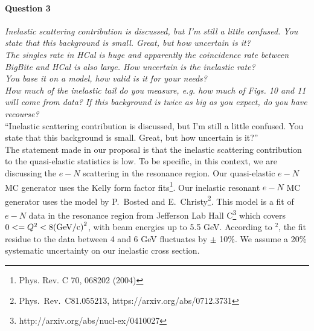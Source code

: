 \documentclass[11pt]{article}
\begin{document}


\paragraph{Question 3}
{\it Inelastic scattering contribution is discussed, but I'm still a
little confused. You state that this background is small.
Great, but how uncertain is it?}\\
{\it The singles rate in HCal is huge and apparently the coincidence rate between BigBite and HCal is also large. 
How uncertain is the inelastic rate?}\\
{\it You base it on a model, how valid is it for your needs?}\\
{\it How much of the inelastic tail do you measure, e.g. how much of Figs. 10 and 11 will come from data?}
{\it If this background is twice as big as you expect, do you have recourse?}\\

``Inelastic scattering contribution is discussed, but I'm still a little confused. You state that this background is small. Great, but how uncertain is it?''\\

The statement made in our proposal is that the inelastic scattering contribution to the quasi-elastic statistics is low. To be specific, in this context, we are discussing the $e-N$ scattering in the resonance region.
Our quasi-elastic $e-N$ MC generator uses the Kelly form factor fits\footnote{Phys. Rev. C 70, 068202 (2004)}.%
Our inelastic resonant $e-N$ MC generator uses the model by P.~Bosted and E.~Christy\footnote{Phys.~Rev.~C81.055213, https://arxiv.org/abs/0712.3731}. %
This model is a fit of $e-N$ data in the resonance region from Jefferson Lab Hall C\footnote{http://arxiv.org/abs/nucl-ex/0410027} which covers $0<=Q^2<8 {\rm (GeV/c)}^2$, with beam energies up to 5.5 GeV.
According to $^2$, %
the fit residue to the data between 4 and 6 GeV fluctuates by $\pm$ 10\%. We assume a 20\% systematic uncertainty on our inelastic cross section. %
\end{document}
